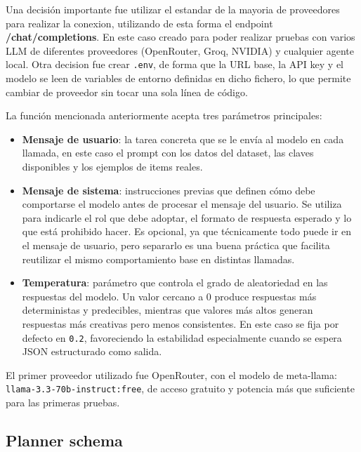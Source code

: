 Una decisión importante fue utilizar el estandar de la mayoria de proveedores para realizar la conexion, utilizando de esta forma el endpoint \textbf{/chat/completions}. En este caso creado para poder realizar pruebas con varios LLM de diferentes proveedores (OpenRouter, Groq, NVIDIA) y cualquier agente local.
Otra decision fue crear \texttt{.env}, de forma que la URL base, la API key y el modelo se leen de variables de entorno definidas en dicho fichero, lo que permite cambiar de proveedor sin tocar una sola línea de código.

La función mencionada anteriormente acepta tres parámetros principales:

\begin{itemize}
    \item \textbf{Mensaje de usuario}: la tarea concreta que se le envía al modelo 
    en cada llamada, en este caso el prompt con los datos del dataset, las claves 
    disponibles y los ejemplos de items reales.
    
    \item \textbf{Mensaje de sistema}: instrucciones previas que definen cómo debe 
    comportarse el modelo antes de procesar el mensaje del usuario. Se utiliza para 
    indicarle el rol que debe adoptar, el formato de respuesta esperado y lo que 
    está prohibido hacer. Es opcional, ya que técnicamente todo puede ir en el 
    mensaje de usuario, pero separarlo es una buena práctica que facilita reutilizar 
    el mismo comportamiento base en distintas llamadas.
    
    \item \textbf{Temperatura}: parámetro que controla el grado de aleatoriedad 
    en las respuestas del modelo. Un valor cercano a 0 produce respuestas más 
    deterministas y predecibles, mientras que valores más altos generan respuestas 
    más creativas pero menos consistentes. En este caso se fija por defecto en 
    \texttt{0.2}, favoreciendo la estabilidad especialmente cuando se espera JSON 
    estructurado como salida.
\end{itemize}

El primer proveedor utilizado fue OpenRouter, con el modelo de meta-llama: \\
\texttt{llama-3.3-70b-instruct:free}, de acceso gratuito y potencia más que suficiente para las primeras pruebas.


\subsection{Planner schema}
\label{subsec:planner-schema}

